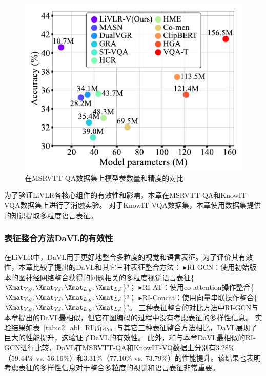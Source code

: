 \begin{figure}[!t]
\centering
\includegraphics[width=0.55\linewidth]{figure/c2_F2.pdf}
\caption{在MSRVTT-QA数据集上模型参数量和精度的对比}
\label{fig:c2_param_acc}
\end{figure}


\label{sec:c2_ab_all}

为了验证LiVLR各核心组件的有效性和影响，本章在MSRVTT-QA和KnowIT-VQA数据集上进行了消融实验。
对于KnowIT-VQA数据集，本章使用数据集提供的知识提取多粒度语言表征。

\subsubsection{表征整合方法DaVL的有效性}
在LiVLR中，DaVL用于更好地整合多粒度的视觉和语言表征。为了评价其有效性，本章比较了提出的DaVL和其它三种表征整合方法：
$\blacktriangleright$RI-GCN：使用初始版本的图神经网络整合获得的问题相关的多粒度视觉语言表征\{$\Xmat_{V, g}, \Xmat_{V, l}, \Xmat_{L, g}, \Xmat_{L, l}$\}$^q$；
$\blacktriangleright$RI-AT：使用co-attention操作整合\{$\Xmat_{V, g}, \Xmat_{V, l}, \Xmat_{L, g}, \Xmat_{L, l}$\}$^q$；
$\blacktriangleright$RI-Concat：使用向量串联操作整合\{$\Xmat_{V, g}, \Xmat_{V, l}, \Xmat_{L, g}, \Xmat_{L, l}$\}$^q$。
三种表征整合的对比方法中RI-GCN与本章提出的DaVL最相似，但它在图编码的过程中没有考虑表征的多样性信息。
实验结果如表~\ref{tab:c2_abl_RI}所示。与其它三种表征整合方法相比，DaVL展现了巨大的性能提升，这验证了DaVL的有效性。
此外，和与本章DaVL最相似的RI-GCN进行比较，DaVL在MSRVTT-QA和KnowIT-VQ数据上分别有3.28\% （59.44\% vs. 56.16\%）和3.31\%（77.10\% vs. 73.79\%）的性能提升。该结果也表明考虑表征的多样性信息对于整合多粒度的视觉和语言表征非常重要。




